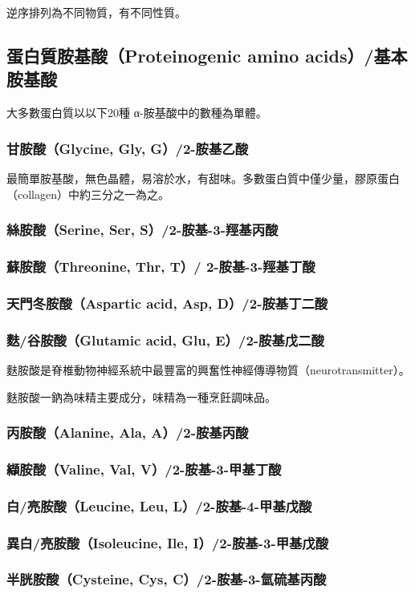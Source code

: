 \documentclass[a4paper,12pt]{report}
\begin{document}
\begin{itemize}
\begin{itemize}
逆序排列為不同物質，有不同性質。
\subsection{蛋白質胺基酸（Proteinogenic amino acids）/基本胺基酸}
大多數蛋白質以以下20種 α-胺基酸中的數種為單體。
\subsubsection{甘胺酸（Glycine, Gly, G）/2-胺基乙酸}
最簡單胺基酸，無色晶體，易溶於水，有甜味。多數蛋白質中僅少量，膠原蛋白（collagen）中約三分之一為之。
\subsubsection{絲胺酸（Serine, Ser, S）/2-胺基-3-羥基丙酸}
\subsubsection{蘇胺酸（Threonine, Thr, T）/
2-胺基-3-羥基丁酸}
\subsubsection{天門冬胺酸（Aspartic acid, Asp, D）/2-胺基丁二酸}
\subsubsection{麩/谷胺酸（Glutamic acid, Glu, E）/2-胺基戊二酸}
麩胺酸是脊椎動物神經系統中最豐富的興奮性神經傳導物質（neurotransmitter）。

麩胺酸一鈉為味精主要成分，味精為一種烹飪調味品。
\subsubsection{丙胺酸（Alanine, Ala, A）/2-胺基丙酸}
\subsubsection{纈胺酸（Valine, Val, V）/2-胺基-3-甲基丁酸}
\subsubsection{白/亮胺酸（Leucine, Leu, L）/2-胺基-4-甲基戊酸}
\subsubsection{異白/亮胺酸（Isoleucine, Ile, I）/2-胺基-3-甲基戊酸}
\subsubsection{半胱胺酸（Cysteine, Cys, C）/2-胺基-3-氫硫基丙酸}

\end{itemize}
\end{itemize}
\end{document}
